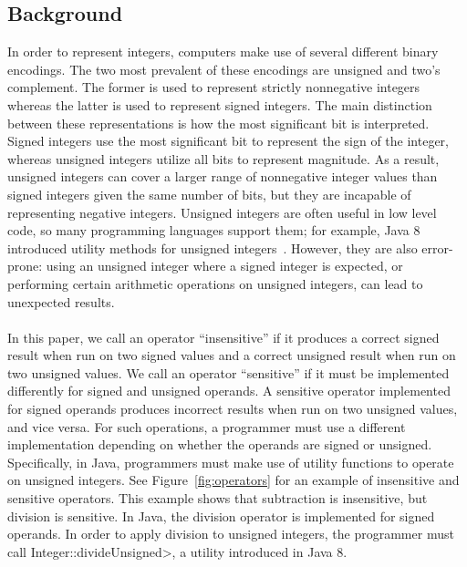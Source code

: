 \subsection{Background}
In order to represent integers, computers make use of several different binary
encodings. The two most prevalent of these encodings are unsigned and two's
complement. The former is used to represent strictly nonnegative integers
whereas the latter is used to represent signed integers.
The main distinction between these representations is
how the most significant bit is interpreted. Signed integers use the most
significant bit to represent the sign of the integer, whereas unsigned integers
utilize all bits to represent magnitude.
As a result, unsigned integers can cover a larger range of nonnegative integer
values than signed integers given the same number of bits, but they are
incapable of representing negative integers.
Unsigned integers are often useful in low level code,
so many programming languages support them;
for example, Java 8 introduced utility methods for unsigned
integers~\cite{JDK8UnsignedIntegerArithmetic2012}.  However, they are also
error-prone:  using an unsigned integer where a signed
integer is expected, or performing certain arithmetic operations on unsigned
integers, can lead to unexpected results.\\
\\
In this paper,
we call an operator ``insensitive'' if it produces a correct signed result
when run on two signed values and a correct unsigned result
when run on two unsigned values.  We call an operator ``sensitive'' if it must
be implemented differently for signed and unsigned operands. A sensitive
operator implemented for signed operands
produces incorrect results when run on two unsigned values, and vice versa.
For such
operations, a programmer must use a different implementation depending on
whether
the operands are signed or unsigned. Specifically, in Java, programmers must
make use of utility functions to operate on unsigned integers.
See Figure~\ref{fig:operators} for
an example of insensitive and sensitive operators. This example shows
that subtraction is insensitive, but division is sensitive. In Java,
the division operator is implemented for signed operands. In order to apply
division to unsigned integers, the programmer must call
\<Integer::divideUnsigned>, a utility introduced in Java 8.

